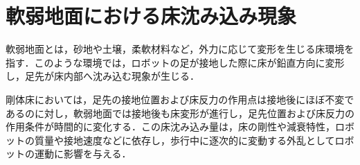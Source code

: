 
\section{軟弱地面における床沈み込み現象}

軟弱地面とは，砂地や土壌，柔軟材料など，外力に応じて変形を生じる床環境を指す．このような環境では，ロボットの足が接地した際に床が鉛直方向に変形し，足先が床内部へ沈み込む現象が生じる．

剛体床においては，足先の接地位置および床反力の作用点は接地後にほぼ不変であるのに対し，軟弱地面では接地後も床変形が進行し，足先位置および床反力の作用条件が時間的に変化する．この床沈み込み量は，床の剛性や減衰特性，ロボットの質量や接地速度などに依存し，歩行中に逐次的に変動する外乱としてロボットの運動に影響を与える．